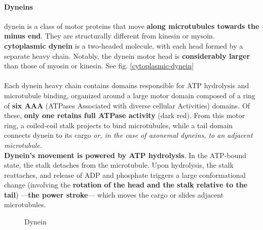 \documentclass[../main.tex]{subfiles}
\begin{document}
\paragraph{Dyneins}
\gls{dynein} is a class of motor proteins that move \textbf{along microtubules towards the minus end}. They are structurally different from kinesin or mysoin.\\
\indent \textbf{cytoplasmic dynein} is a two-headed molecule, with each head formed by a separate heavy chain. Notably, the dynein motor head is \textbf{considerably larger} than those of myosin or kinesin. See fig. \ref{cytoplasmic-dynein}\\
\\
Each dynein heavy chain contains domains responsible for ATP hydrolysis and microtubule binding, organized around a large motor domain composed of a ring of \textbf{six AAA} (ATPases Associated with diverse cellular Activities) domains. Of these, \textbf{only one retains full ATPase activity} (dark red). From this motor ring, a coiled-coil stalk projects to bind microtubules, while a tail domain connects dynein to its cargo \textit{or, in the case of axonemal dyneins, to an adjacent microtubule.}\\
\indent\textbf{ Dynein’s movement is powered by ATP hydrolysis}. In the ATP-bound state, the stalk detaches from the microtubule. Upon hydrolysis, the stalk reattaches, and release of ADP and phosphate triggers a large conformational change (involving the\textbf{ rotation of the head and the stalk relative to the tail}) —\textbf{the power stroke}— which moves the cargo or slides adjacent microtubules. 

\begin{figure}[H]
	\centering
	\caption{Dynein}
\end{figure}
\end{document}
